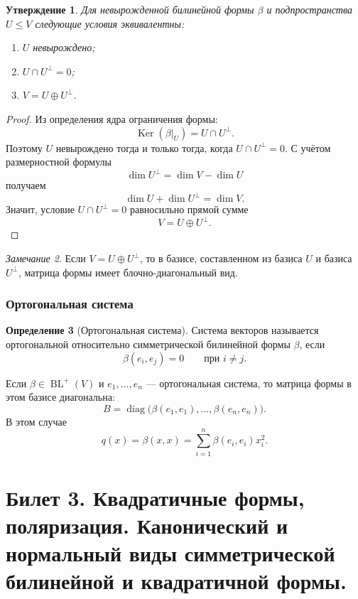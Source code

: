 \documentclass[12pt,a4paper]{article}
\theoremstyle{definition}
\newtheorem{definition}{Определение}[section]
\theoremstyle{plain}
\newtheorem{proposition}[definition]{Утверждение}
\theoremstyle{remark}
\newtheorem{remark}[definition]{Замечание}
\newcommand{\BL}{\operatorname{BL}}
\newcommand{\Ker}{\operatorname{Ker}}
\newcommand{\diag}{\operatorname{diag}}
\begin{document}
\begin{proposition}
Для невырожденной билинейной формы $\beta$ и подпространства $U\le V$ следующие условия эквивалентны:
\begin{enumerate}[label=\arabic*)]
    \item $U$ невырождено;
    \item $U\cap U^\perp=0$;
    \item $V=U\oplus U^\perp$.
\end{enumerate}
\end{proposition}

\begin{proof}
Из определения ядра ограничения формы:
\[
    \Ker(\beta|_U)=U\cap U^\perp.
\]
Поэтому $U$ невырождено тогда и только тогда, когда $U\cap U^\perp=0$.
С учётом размерностной формулы
\[
    \dim U^\perp=\dim V-\dim U
\]
получаем
\[
    \dim U+\dim U^\perp=\dim V.
\]
Значит, условие $U\cap U^\perp=0$ равносильно прямой сумме
\[
    V=U\oplus U^\perp.
\]
\end{proof}

\begin{remark}
Если $V=U\oplus U^\perp$, то в базисе, составленном из базиса $U$ и базиса $U^\perp$, матрица формы имеет блочно-диагональный вид.
\end{remark}

\subsubsection*{Ортогональная система}

\begin{definition}[Ортогональная система]
Система векторов называется ортогональной относительно симметрической билинейной формы $\beta$, если
\[
    \beta(e_i,e_j)=0
    \qquad \text{при } i\ne j.
\]
\end{definition}

Если $\beta\in\BL^+(V)$ и $e_1,
\ldots,e_n$ --- ортогональная система, то матрица формы в этом базисе диагональна:
\[
    B=\diag\bigl(\beta(e_1,e_1),\ldots,\beta(e_n,e_n)\bigr).
\]
В этом случае
\[
    q(x)=\beta(x,x)=\sum_{i=1}^n \beta(e_i,e_i)x_i^2.
\]

\clearpage

\section{Билет 3. Квадратичные формы, поляризация. Канонический и нормальный виды симметрической билинейной и квадратичной формы.}
\end{document}
